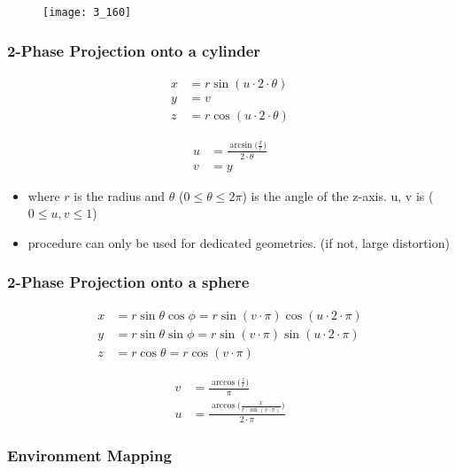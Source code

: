 \documentclass{standalone}
\begin{document}
\begin{figure}[H]
	\texttt{[image: 3\_160]}
\end{figure} 

\subsubsection*{2-Phase Projection onto a cylinder}

\begin{align}
	x &= r \sin (u \cdot 2 \cdot \theta) \\
	y &= v \\
	z &= r \cos (u \cdot 2 \cdot \theta)
\end{align}

\begin{align}
	u &= \frac{\arcsin \big( \frac{x}{r} \big)}{2 \cdot \theta} \\
	v &= y 
\end{align}

\begin{itemize}
	\item where $r$ is the radius and $\theta$ ($0 \leq \theta \leq 2\pi$) is the angle of the z-axis. u, v is ($0 \leq u, v \leq 1$)
	\item procedure can only be used for dedicated geometries. (if not, large distortion)
\end{itemize}


\subsubsection*{2-Phase Projection onto a sphere}

\begin{align}
	x &= r \sin \theta \cos \phi = r \sin (v \cdot \pi) \cos (u \cdot 2 \cdot \pi) \\
	y &= r \sin \theta \sin \phi = r \sin (v \cdot \pi) \sin (u \cdot 2 \cdot \pi) \\
	z &= r \cos \theta = r \cos (v \cdot \pi)
\end{align}

\begin{align}
	v &= \frac{\arccos \big( \frac{z}{r} \big) }{\pi} \\
	u &= \frac{\arccos \big( \frac{x}{r \cdot \sin (v \cdot \pi) } \big)}{2 \cdot \pi} 
\end{align}

\subsubsection*{Environment Mapping}
\end{document}
